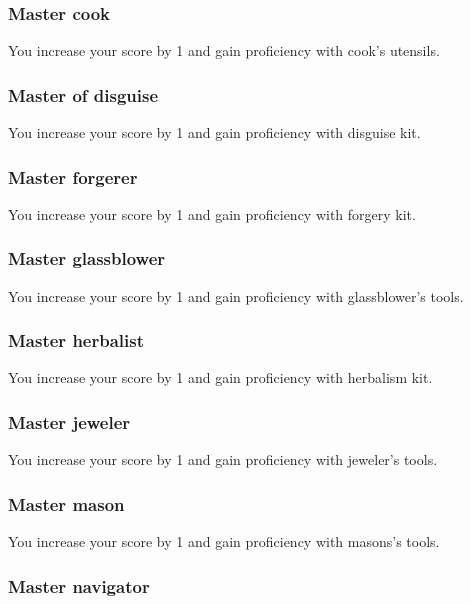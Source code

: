\subsubsection{Master cook}

You increase your \wisdom{} score by 1 and gain proficiency with cook's utensils.

\subsubsection{Master of disguise}

You increase your \charisma{} score by 1 and gain proficiency with disguise kit.

\subsubsection{Master forgerer}

You increase your \charisma{} score by 1 and gain proficiency with forgery kit.

\subsubsection{Master glassblower}

You increase your \dexterity{} score by 1 and gain proficiency with glassblower's tools.

\subsubsection{Master herbalist}

You increase your \wisdom{} score by 1 and gain proficiency with herbalism kit.

\subsubsection{Master jeweler}

You increase your \dexterity{} score by 1 and gain proficiency with jeweler's tools.

\subsubsection{Master mason}

You increase your \strength{} score by 1 and gain proficiency with masons's tools.

\subsubsection{Master navigator}

